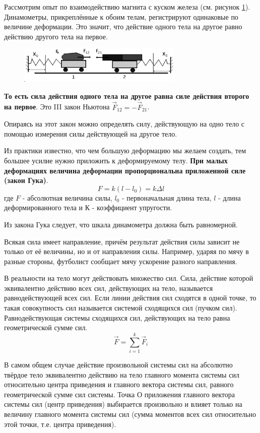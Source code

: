 \documentclass[a6paper, 11pt]{diss_4}
\renewcommand{\'}{\,'}
\begin{document}
  Рассмотрим опыт по взаимодействию магнита с куском железа (см.
рисунок \ref{rm}). Динамометры, прикреплённые к обоим телам, регистрируют одинаковые по
величине деформации. Это значит, что действие одного тела на другое равно
действию другого тела на первое.

\begin{figure}
\begin{center}
  \includegraphics[width=0.7\textwidth]{img/ris_25.eps}\\
\end{center}
\caption{}\label{rm}
\end{figure}

\textbf{То есть сила действия одного тела на другое
равна силе действия второго на первое}.
Это III закон Ньютона $\vec{F}_{12}=-\vec{F}_{21}$.

  Опираясь на этот закон можно определять силу, действующую на одно тело с
помощью измерения силы действующей на другое тело.

  Из практики известно, что чем большую деформацию мы желаем создать, тем
большее усилие нужно приложить к деформируемому телу. \textbf{При малых деформациях
величина деформации пропорциональна приложенной силе (закон Гука)}.
\[
F=k(l-l_0)=k\Delta l
\]
 где $F$ - абсолютная величина силы, $l_0$ - первоначальная длина тела, $l$ -
длина деформированного тела и $К$ - коэффициент упругости.

  Из закона Гука следует, что шкала динамометра должна быть равномерной.

  Всякая сила имеет направление, причём результат действия силы зависит не
только от её величины, но и от направления силы. Например, ударяя по мячу в
разные стороны, футболист сообщает мячу ускорение разного направления.

  В реальности на тело могут действовать множество сил. Сила, действие
которой эквивалентно действию всех сил, действующих на тело, называется
равнодействующей всех сил. Если линии действия сил сходятся в одной точке, то
такая совокупность сил называется системой сходящихся сил (пучком сил).
Равнодействующая системы сходящихся сил, действующих на тело равна
геометрической сумме сил.
\[
\vec{F}=\sum\limits_{i=1}^{k}\vec{F}_i
\]

  В самом общем случае действие произвольной системы сил на абсолютно
твёрдое тело эквивалентно действию на тело главного момента системы сил
относительно центра приведения и главного вектора системы сил, равного
геометрической сумме сил системы. Точка О приложения главного вектора системы
сил (центр приведения) выбирается произвольно и влияет только на величину
главного момента системы сил (сумма моментов всех сил относительно этой точки,
т.е. центра приведения).
\end{document}
